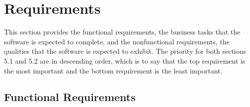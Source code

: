 \documentclass[12pt]{article}
\begin{document}
\section{Requirements}

This section provides the functional requirements, the business tasks that the
software is expected to complete, and the nonfunctional requirements, the
qualities that the software is expected to exhibit. The priority for both sections 5.1 and 5.2 are in descending order, 
which is to say that the top requirement is the most important and the bottom requirement is the least important.

\subsection{Functional Requirements}
\end{document}

